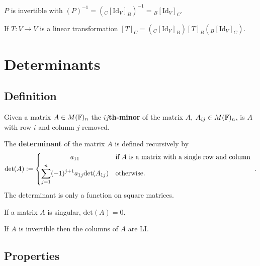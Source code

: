 \begin{corollary}
    $P$ is invertible with $(P)^{-1}= ({}_C[\text{Id}_V]_B)^{-1} = {}_B[\text{Id}_V]_C$. 
\end{corollary}

\begin{theorem}
    If $T:V\rightarrow V$ is a linear transformation $[T]_C = ({}_C[\text{Id}_V]_B)[T]_B({}_B[\text{Id}_V]_C)$.
\end{theorem}

\section{Determinants}

\subsection{Definition}

\begin{definition}
    Given a matrix $A\in M(\mathbb{F})_n$ the \textbf{$ij$th-minor} of the matrix $A$, $A_{ij}\in M(\mathbb{F})_n$, is $A$ with row $i$ and column $j$ removed.
\end{definition}

\begin{definition}[Determinant]
    The \textbf{determinant} of the matrix $A$ is defined recursively by \[
    \text{det}(A) := 
    \begin{dcases}
    \omit\hfil $a_{11}$\hfil & \textcolor{black}{\text{if }} A \textcolor{black}{\text{ is a matrix with a single row and column }}\\
    \sum_{j=1}^n (-1)^{j+1} a_{1j} \text{det}(A_{1j}) & \textcolor{black}{\text{otherwise.}}
    \end{dcases} 
    \textcolor{black}{.}
    \]
    The determinant is only a function on square matrices.
\end{definition}

\begin{theorem}
    If a matrix $A$ is singular, $\text{det}(A)=0$.
\end{theorem}

\begin{theorem}
    If $A$ is invertible then the columns of $A$ are LI.
\end{theorem}

\subsection{Properties}

